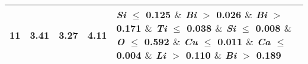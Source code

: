 \begin{table}[!htbp]
\begin{tabular}{ccccp{}}
		\hline
		11 & 3.41 & 3.27 & 4.11 & \textit{Si} $\le$ 0.125 $\&$ \textit{Bi} $>$ 0.026 $\&$ \textit{Bi} $>$ 0.171 $\&$ \textit{Ti} $\le$ 0.038 $\&$ \textit{Si} $\le$ 0.008 $\&$ \textit{O} $\le$ 0.592 $\&$ \textit{Cu} $\le$ 0.011 $\&$ \textit{Ca} $\le$ 0.004 $\&$ \textit{Li} $>$ 0.110 $\&$ \textit{Bi} $>$ 0.189\\
		\bottomrule
	\end{tabular}
\end{table}
